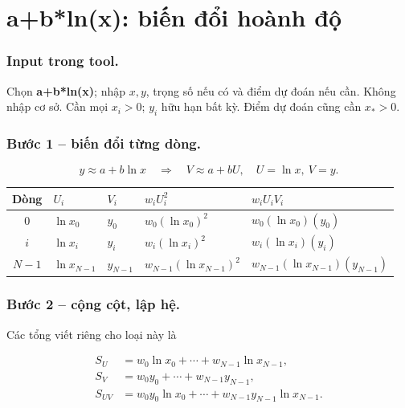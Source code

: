 \examplebreak
\section{a+b*ln(x): biến đổi hoành độ}

\label{sec:ls-plus-log}

\subsubsection*{Input trong tool.} Chọn \textbf{a+b*ln(x)}; nhập $x,y$, trọng số nếu có và điểm dự đoán nếu cần. Không nhập cơ sở. Cần mọi $x_i>0$; $y_i$ hữu hạn bất kỳ. Điểm dự đoán cũng cần $x_*>0$.

\subsubsection*{Bước 1 -- biến đổi từng dòng.}\[y\approx a+b\ln x\quad\Longrightarrow\quad V\approx a+bU,\quad U=\ln x,\ V=y.\]

\begin{center}\small\begin{tabular}{cllll}\toprule

Dòng&$U_i$&$V_i$&$w_iU_i^2$&$w_iU_iV_i$\\\midrule

$0$&$\ln x_0$&$y_0$&$w_{0}(\ln x_0)^2$&$w_{0}(\ln x_0)(y_0)$\\

$i$&$\ln x_{i}$&$y_{i}$&$w_{i}(\ln x_{i})^2$&$w_{i}(\ln x_{i})(y_{i})$\\

$N-1$&$\ln x_{N-1}$&$y_{N-1}$&$w_{N-1}(\ln x_{N-1})^2$&$w_{N-1}(\ln x_{N-1})(y_{N-1})$\\

\bottomrule\end{tabular}\end{center}

\subsubsection*{Bước 2 -- cộng cột, lập hệ.} Các tổng viết riêng cho loại này là

\begin{align*}S_U&=w_0\ln x_0+\cdots+w_{N-1}\ln x_{N-1},\\S_V&=w_0y_0+\cdots+w_{N-1}y_{N-1},\\S_{UV}&=w_0y_0\ln x_0+\cdots+w_{N-1}y_{N-1}\ln x_{N-1}.\end{align*}

